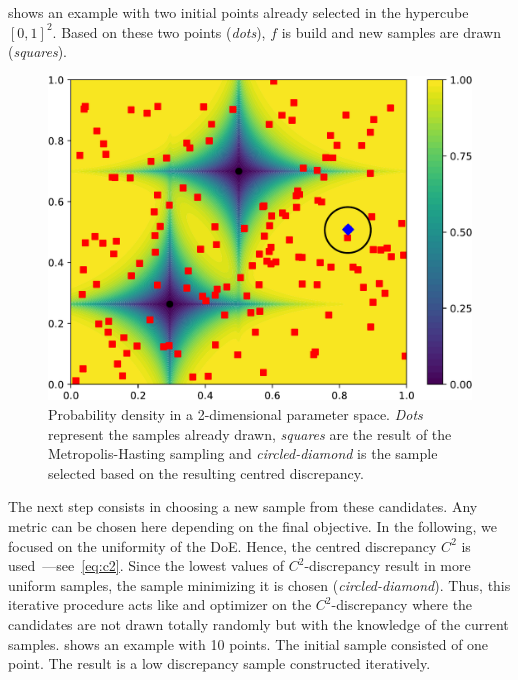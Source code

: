  shows an example with two initial points already selected in the hypercube $[0, 1]^2$. Based on these two points (\emph{dots}), $f$ is build and new samples are drawn (\emph{squares}).

\begin{figure}[!h]
\centering
\includegraphics[width=0.7\linewidth,keepaspectratio]{fig/contributions/doe/sampling_KDE.pdf}
\caption{Probability density in a 2-dimensional parameter space. \emph{Dots} represent the samples already drawn, \emph{squares} are the result of the Metropolis-Hasting sampling and \emph{circled-diamond} is the sample selected based on the resulting centred discrepancy.}
\label{fig:sample_kde}
\end{figure}

The next step consists in choosing a new sample from these candidates. Any metric can be chosen here depending on the final objective. In the following, we focused on the uniformity of the DoE. Hence, the centred discrepancy $C^2$ is used~\citep{Fang2006}---see~\cref{eq:c2}. Since the lowest values of $C^2$-discrepancy result in more uniform samples, the sample minimizing it is chosen (\emph{circled-diamond}). Thus, this iterative procedure acts like and optimizer on the $C^2$-discrepancy where the candidates are not drawn totally randomly but with the knowledge of the current samples.  shows an example with 10 points. The initial sample consisted of one point. The result is a low discrepancy sample constructed iteratively.

